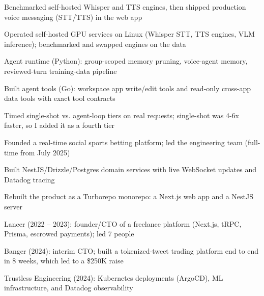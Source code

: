 \documentclass[print]{jack-resume}
\begin{document}
\begin{tightemize}
    \item Benchmarked self-hosted Whisper and TTS engines, then shipped production voice messaging (STT/TTS) in the web app
    \item Operated self-hosted GPU services on Linux (Whisper STT, TTS engines, VLM inference); benchmarked and swapped engines on the data
    \item Agent runtime (Python): group-scoped memory pruning, voice-agent memory, reviewed-turn training-data pipeline
    \item Built agent tools (Go): workspace app write/edit tools and read-only cross-app data tools with exact tool contracts
    \item Timed single-shot vs. agent-loop tiers on real requests; single-shot was 4-6x faster, so I added it as a fourth tier
\end{tightemize}
\sectionsep

\begin{tightemize}
    \item Founded a real-time social sports betting platform; led the engineering team (full-time from July 2025)
    \item Built NestJS/Drizzle/Postgres domain services with live WebSocket updates and Datadog tracing
    \item Rebuilt the product as a Turborepo monorepo: a Next.js web app and a NestJS server
\end{tightemize}
\sectionsep

\begin{tightemize}
    \item Lancer (2022 -- 2023): founder/CTO of a freelance platform (Next.js, tRPC, Prisma, escrowed payments); led 7 people
    \item Banger (2024): interim CTO; built a tokenized-tweet trading platform end to end in 8 weeks, which led to a \$250K raise
    \item Trustless Engineering (2024): Kubernetes deployments (ArgoCD), ML infrastructure, and Datadog observability
\end{tightemize}
\sectionsep
\end{document}
